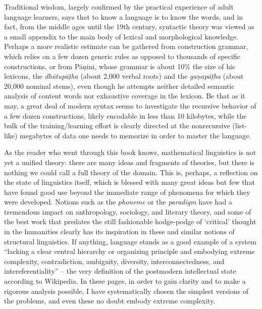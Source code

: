Traditional wisdom, largely confirmed by the practical experience of adult
language learners, says that to know a language is to know the words, and in
fact, from the middle ages until the 19th century, syntactic theory was viewed
as a small appendix to the main body of lexical and morphological knowledge.
Perhaps a more realistic estimate can be gathered from construction
grammar, which relies on a few dozen generic rules
as opposed to thousands of specific constructions, or from
P\={a}\d{n}ini, whose grammar is about 10\% the size of
his lexicons, the {\it dh\={a}tup\={a}\d{t}ha}
(about 2,000 verbal roots) and the {\it
  ga\d{n}ap\={a}\d{t}ha} (about 20,000 nominal
stems), even though he attempts neither detailed semantic analysis of content
words nor exhaustive coverage in the lexicon. Be that as it may, a great deal
of modern syntax seems to investigate the recursive behavior of a few dozen
constructions, likely encodable in less than 10 kilobytes, while the bulk of
the training/learning effort is clearly directed at the nonrecursive
(list-like) megabytes of data one needs to memorize in order to master the
language.

As the reader who went through this book knows, mathematical linguistics is
not yet a unified theory: there are many ideas and fragments of theories, but
there is nothing we could call a full theory of the domain. This is, perhaps,
a reflection on the state of linguistics itself, which is blessed with many
great ideas but few that have found good use beyond the immediate range of
phenomena for which they were developed. Notions such as the {\it phoneme} or
the {\it paradigm} have had a tremendous impact on anthropology, sociology,
and literary theory, and some of the best work that predates the still
fashionable hodge-podge of `critical' thought in the humanities clearly has
its inspiration in these and similar notions of structural linguistics. If
anything, language stands as a good example of a system ``lacking a clear
central hierarchy or organizing principle and embodying extreme complexity,
contradiction, ambiguity, diversity, interconnectedness, and
intereferentiality'' -- the very definition of the postmodern intellectual
state according to Wikipedia. In these pages, in order to gain clarity and to
make a rigorous analysis possible, I have systematically chosen the simplest
versions of the problems, and even these no doubt embody extreme complexity.

